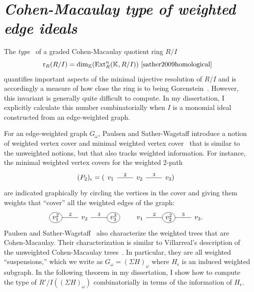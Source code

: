 \documentclass{article}
\begin{document}
\section{\textsl{\large Cohen-Macaulay type of weighted edge ideals}} \label{section2}
The \emph{type}~\cite{MR1251956} of a graded Cohen-Macaulay quotient ring $R/I$ 
    \[\operatorname{r}_R(R/I) = \dim_{\mathbb{K}}(\operatorname{Ext}_R^n(\mathbb{K},R/I))~\cite{sather2009homological}\]
    quantifies important aspects of the minimal injective resolution of $R/I$ and is accordingly a measure of how close the ring is to being Gorenstein~\cite{MR0242802}. However, this invariant is generally quite difficult to compute. In my dissertation, I explicitly calculate this number combinatorially when $I$ is a monomial ideal constructed from an edge-weighted graph. \par
    For an edge-weighted graph $G_\omega$, Paulsen and Sather-Wagstaff introduce a notion of weighted vertex cover and minimal weighted vertex cover~\cite{MR3055580} that is similar to the unweighted notions, but that also tracks weighted information. For instance, the minimal weighted vertex covers for the weighted 2-path 
    \[(P_2)_\epsilon = (\begin{tikzcd}v_1 \ar[r,dash,"2"] & v_2 \ar[r,dash,"3"] & v_3)\end{tikzcd}\]
    are indicated graphically by circling the vertices in the cover and giving them weights that ``cover'' all the weighted edges of the graph:
    \[
        \begin{tikzcd}[every matrix/.append style={name=m},
          execute at end picture={
              \draw [<-] (m-1-1) ellipse (0.33cm and 0.26cm);
              \draw [<-] (m-1-3) ellipse (0.33cm and 0.26cm);
          }]
          v_1^2 \ar[r,dash,"2"] & v_2 \ar[r,dash,"3"] & v_3^3
        \end{tikzcd} \ \ \ \ \ \ 
        \begin{tikzcd}[every matrix/.append style={name=m},
          execute at end picture={
              \draw [<-] (m-1-2) ellipse (0.33cm and 0.26cm);
          }]
          v_1 \ar[r,dash,"2"] & v_2^2 \ar[r,dash,"3"] & v_3.
        \end{tikzcd}
    \]
    Paulsen and Sather-Wagstaff~\cite{MR3055580} also characterize the weighted trees that are Cohen-Macaulay. Their characterization is similar to Villarreal's description of the unweighted Cohen-Macaulay trees~\cite{MR1031197}. In particular, they are all weighted ``suspensions,'' which we write as $G_\omega=(\Sigma H)_\omega$ where $H_\epsilon$ is an induced weighted subgraph. In the following theorem in my dissertation, I show how to compute the type of $R'/I((\Sigma H)_\omega)$ combinatorially in terms of the information of $H_\epsilon$.
\end{document}
